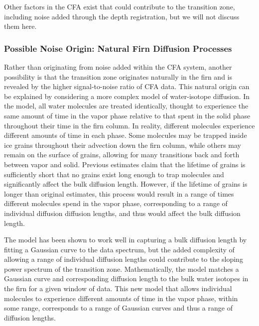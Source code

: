 \documentclass[draft, jgrga]{AGUTeX}
\begin{document}
\begin{article}
Other factors in the CFA exist that could contribute to the transition zone, including noise added through the depth registration, but we will not discuss them here.


\subsubsection{Possible Noise Origin: Natural Firn Diffusion Processes}

Rather than originating from noise added within the CFA system, another possibility is that the transition zone originates naturally in the firn and is revealed by the higher signal-to-noise ratio of CFA data. This natural origin can be explained by considering a more complex model of water-isotope diffusion. In the \citet{Johnsen2000} model, all water molecules are treated identically, thought to experience the same amount of time in the vapor phase relative to that spent in the solid phase throughout their time in the firn column. In reality, different molecules experience different amounts of time in each phase. Some molecules may be trapped inside ice grains throughout their advection down the firn column, while others may remain on the surface of grains, allowing for many transitions back and forth between vapor and solid. Previous estimates \citep{Whillans1985, Johnsen2000} claim that the lifetime of grains is sufficiently short that no grains exist long enough to trap molecules and significantly affect the bulk diffusion length. However, if the lifetime of grains is longer than original estimates, this process would result in a range of times different molecules spend in the vapor phase, corresponding to a range of individual diffusion diffusion lengths, and thus would affect the bulk diffusion length.

The \citet{Johnsen2000} model has been shown to work well in capturing a bulk diffusion length by fitting a Gaussian curve to the data spectrum, but the added complexity of allowing a range of individual diffusion lengths could contribute to the sloping power spectrum of the transition zone. Mathematically, the \citet{Johnsen2000} model matches a Gaussian curve and corresponding diffusion length to the bulk water isotopes in the firn for a given window of data. This new model that allows individual molecules to experience different amounts of time in the vapor phase, within some range, corresponds to a range of Gaussian curves and thus a range of diffusion lengths.


\end{article}
\end{document}
